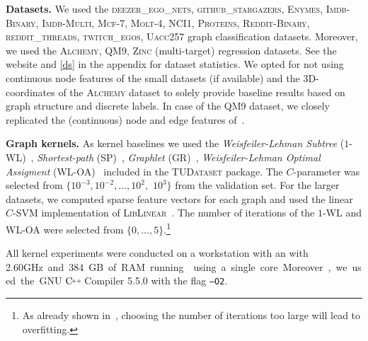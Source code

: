 \documentclass{article}
\newcommand{\xhdr}[1]{{\noindent\bfseries #1}}
\theoremstyle{definition}
\newcommand{\CC}[1][]{$\text{C\hspace{-.25ex}}^{_{_{_{++}}}}
	\ifthenelse{\equal{#1}{}}{}{\text{\hspace{-.625ex}#1}}$}
\newcommand{\new}[1]{\emph{#1}}
\begin{document}
\xhdr{Datasets.} We used the \textsc{deezer\_ego\_nets}, \textsc{github\_stargazers}, \textsc{Enymes}, \textsc{Imdb-Binary}, \textsc{Imdb-Multi}, \textsc{Mcf-7}, \textsc{Molt-4},    \textsc{NCI1}, \textsc{Proteins},
\textsc{Reddit-Binary}, \textsc{reddit\_threads}, \textsc{twitch\_egos}, \textsc{Uacc257} graph classification datasets. Moreover, we used the \textsc{Alchemy}, \textsc{QM9}, \textsc{Zinc} (multi-target) regression datasets. See the website and \cref{ds} in the appendix for dataset statistics. We opted for not using continuous node features of the small datasets (if available) and the 3D-coordinates of the \textsc{Alchemy} dataset to solely provide baseline results based on graph structure and discrete labels. In case of the \textsc{QM9} dataset, we closely replicated the (continuous) node and edge features of~\citet{Gil+2017}.


\xhdr{Graph kernels.} As kernel baselines we used the \new{Weisfeiler-Lehman Subtree} (\textsc{$1$-WL})~\cite{She+2011}, \new{Shortest-path} (\textsc{SP})~\cite{Bor+2005}, \new{Graphlet} (\textsc{GR})~\cite{She+2009}, \new{Weisfeiler-Lehman Optimal Assigment} (\textsc{WL-OA})~\cite{Kri+2016} included in the \textsc{TUDataset} package. The $C$-parameter was selected from $\{10^{-3}, 10^{-2}, \dotsc, 10^{2},$ $10^{3}\}$ from the validation set. For the larger datasets, we computed sparse feature vectors for each graph and used the linear $C$-SVM implementation of \textsc{LibLinear}~\cite{Fan+2008}. The number of iterations of the \textsc{$1$-WL} and \textsc{WL-OA} were selected from $\{0,\dotsc,5\}$.\footnote{As already shown in~\cite{She+2011}, choosing the number of iterations too large will lead to overfitting.}

All kernel experiments were conducted on a workstation with an  with 2.60\si GHz and 384\si GB of RAM running  using a single core. Moreover, we used the GNU \CC Compiler 5.5.0 with the flag \texttt{--O2}. 
\end{document}
